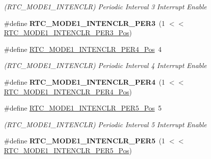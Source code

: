 \begin{DoxyCompactItemize}
\begin{DoxyCompactList}\small\item\em (R\+T\+C\+\_\+\+M\+O\+D\+E1\+\_\+\+I\+N\+T\+E\+N\+C\+L\+R) Periodic Interval 3 Interrupt Enable \end{DoxyCompactList}\item 
\hypertarget{group___s_a_m_l21___r_t_c_gab41bf83a096b038b575ec4df3201349c}{}\#define {\bfseries R\+T\+C\+\_\+\+M\+O\+D\+E1\+\_\+\+I\+N\+T\+E\+N\+C\+L\+R\+\_\+\+P\+E\+R3}~(1 $<$$<$ \hyperlink{group___s_a_m_l21___r_t_c_ga414d45cfd0db35498bf791ab099cc48c}{R\+T\+C\+\_\+\+M\+O\+D\+E1\+\_\+\+I\+N\+T\+E\+N\+C\+L\+R\+\_\+\+P\+E\+R3\+\_\+\+Pos})\label{group___s_a_m_l21___r_t_c_gab41bf83a096b038b575ec4df3201349c}

\item 
\hypertarget{group___s_a_m_l21___r_t_c_ga39b017b8fae5c9c2ada80433b7f29c86}{}\#define \hyperlink{group___s_a_m_l21___r_t_c_ga39b017b8fae5c9c2ada80433b7f29c86}{R\+T\+C\+\_\+\+M\+O\+D\+E1\+\_\+\+I\+N\+T\+E\+N\+C\+L\+R\+\_\+\+P\+E\+R4\+\_\+\+Pos}~4\label{group___s_a_m_l21___r_t_c_ga39b017b8fae5c9c2ada80433b7f29c86}

\begin{DoxyCompactList}\small\item\em (R\+T\+C\+\_\+\+M\+O\+D\+E1\+\_\+\+I\+N\+T\+E\+N\+C\+L\+R) Periodic Interval 4 Interrupt Enable \end{DoxyCompactList}\item 
\hypertarget{group___s_a_m_l21___r_t_c_ga846aff2b0328dd514e548c589597e0fe}{}\#define {\bfseries R\+T\+C\+\_\+\+M\+O\+D\+E1\+\_\+\+I\+N\+T\+E\+N\+C\+L\+R\+\_\+\+P\+E\+R4}~(1 $<$$<$ \hyperlink{group___s_a_m_l21___r_t_c_ga39b017b8fae5c9c2ada80433b7f29c86}{R\+T\+C\+\_\+\+M\+O\+D\+E1\+\_\+\+I\+N\+T\+E\+N\+C\+L\+R\+\_\+\+P\+E\+R4\+\_\+\+Pos})\label{group___s_a_m_l21___r_t_c_ga846aff2b0328dd514e548c589597e0fe}

\item 
\hypertarget{group___s_a_m_l21___r_t_c_gad5286473381f477ba155ec781a353167}{}\#define \hyperlink{group___s_a_m_l21___r_t_c_gad5286473381f477ba155ec781a353167}{R\+T\+C\+\_\+\+M\+O\+D\+E1\+\_\+\+I\+N\+T\+E\+N\+C\+L\+R\+\_\+\+P\+E\+R5\+\_\+\+Pos}~5\label{group___s_a_m_l21___r_t_c_gad5286473381f477ba155ec781a353167}

\begin{DoxyCompactList}\small\item\em (R\+T\+C\+\_\+\+M\+O\+D\+E1\+\_\+\+I\+N\+T\+E\+N\+C\+L\+R) Periodic Interval 5 Interrupt Enable \end{DoxyCompactList}\item 
\hypertarget{group___s_a_m_l21___r_t_c_gaa5c34aa2621449b141646ee2b749a047}{}\#define {\bfseries R\+T\+C\+\_\+\+M\+O\+D\+E1\+\_\+\+I\+N\+T\+E\+N\+C\+L\+R\+\_\+\+P\+E\+R5}~(1 $<$$<$ \hyperlink{group___s_a_m_l21___r_t_c_gad5286473381f477ba155ec781a353167}{R\+T\+C\+\_\+\+M\+O\+D\+E1\+\_\+\+I\+N\+T\+E\+N\+C\+L\+R\+\_\+\+P\+E\+R5\+\_\+\+Pos})\label{group___s_a_m_l21___r_t_c_gaa5c34aa2621449b141646ee2b749a047}


\end{DoxyCompactItemize}
